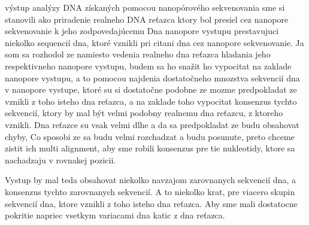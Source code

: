 výstup analýzy DNA získaných pomocou nanopórového sekvenovania 
sme si stanovili ako priradenie realneho DNA reťazca ktory bol 
presiel cez nanopore sekvenovanie k jeho zodpovedajúcemu 
Dna nanopore vystupu prestavujuci niekolko sequencií dna, 
ktoré vznikli pri citani dna cez nanopore sekvenovanie.
Ja som sa rozhodol ze namiesto vedenia realneho dna reťazca
hladania jeho respektivneho nanopore vystupu, 
budem sa ho snažit ho vypocitat na zaklade nanopore vystupu,
a to pomocou najdenia dostatočneho mnozstva sekvencií dna v nanopore vystupe,
ktoré su si dostatočne podobne ze mozme predpokladat ze vznikli 
z toho isteho dna reťazca, a na zaklade toho vypocitat konsenzus tychto sekvencií, 
ktory by mal být velmi podobny realnemu dna reťazcu, z ktoreho vznikli.
Dna reťazce su vsak velmi dlhe a da sa predpokladat ze budu obsahovat chyby, 
Co sposobi ze sa budu velmi rozchadzat a budu posunute, preto chceme zistit ich multi alignment,
aby sme robili konsenzus pre tie nukleotidy, ktore sa nachadzaju v rovnakej pozicii.


Vystup by mal teda obsahovat niekolko navzajom zarovnanych sekvencií dna,
a konsenzus tychto zarovnanych sekvencií. A to niekolko krat, pre viacero skupin sekvencií dna, ktore vznikli z toho isteho dna reťazca.
Aby sme mali dostatocne pokritie napriec vsetkym variacami dna katic z dna reťazca.




